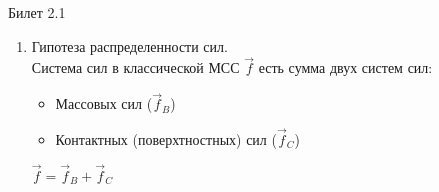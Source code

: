 \documentclass[a4paper,12pt]{article}
\begin{document}
\begin{mybox}{\hypertarget{bil2_1}{Билет 2.1}}
\begin{enumerate}
    Теорема Родона-Никодима:\\
    Пусть $(X, F, \mu)$ -- пространство с мерой и мера $\mu\;\sigma$-конечна. Тогда если мера $\nu: F\to R$ абсолютно непрерывна относительно $\mu\;(\nu << \mu)$, то $\exists$ измеримая функция $f:X\to R: \nu(A) = \int\limits_A f(x)\mu(dx)\;\; \forall A\in F$ (интеграл Лебега).\\
    По теореме Родона-Никодима существует плотность $\rho:$\\
    $M(\mathscr{B}) = \int_{\bar{\chi}(\mathscr{B},t)} \rho(\bar{x}, t) dV = \int_{\bar{\chi}(\mathscr{B},t')} \rho(\bar{x}, t') dV$\\
    $dM = \rho(\bar{x}, t)dV_t = \rho(\bar{x}, t')dV_{t'}\Rightarrow \rho_tdV_t = \rho_{t'}dV_{t'}$\\
    $V(\bar{\chi}(\mathscr{B}, t)) = \int_{\bar{\chi}(\mathscr{B}, t)} dV,\; V(\bar{\chi}(\mathscr{B}, t')) = \int_{\bar{\chi}(\mathscr{B}, t')} dV = \int_{\bar{\chi}(\mathscr{B}, t)} J_{t, t'} dV $, где $J$ -- якобиан смены конфигурации.\\
    Следствие. $dV_{t'} = J_{t, t'}dV_t$, и потому $\rho_t dV_t = \rho_{t'} J_{t, t'} dV_{t'}\Rightarrow \rho(\bar{x}_t, t) = \rho(\bar{x}_{t'}, t') J_{t, t'}$ -- уравнение неразрывности в форме Лагранжа.
    \item Гипотеза распределенности сил.\\
    Система сил в классической МСС $\vec{f}$ есть сумма двух систем сил:
    \begin{itemize}
        \item Массовых сил ($\vec{f}_B$)
        \item Контактных (поверхтностных) сил ($\vec{f}_C$)
    \end{itemize}
    $\vec{f} = \vec{f}_B + \vec{f}_C$\\



\end{enumerate}
\end{mybox}
\end{document}
